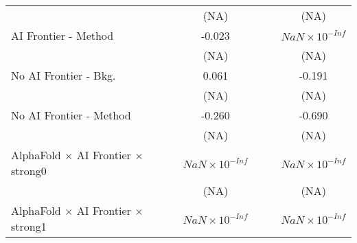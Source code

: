 \begin{tabular}{lcccccc}
                                                                              &                        &                        & (NA)                   &                        &                        & (NA)\\   
   AI Frontier - Method                                                       &                        &                        & -0.023                 &                        &                        & $NaN\times 10^{-Inf}$\\    
                                                                              &                        &                        & (NA)                   &                        &                        & (NA)\\   
   No AI Frontier - Bkg.                                                      &                        &                        & 0.061                  &                        &                        & -0.191\\   
                                                                              &                        &                        & (NA)                   &                        &                        & (NA)\\   
   No AI Frontier - Method                                                    &                        &                        & -0.260                 &                        &                        & -0.690\\   
                                                                              &                        &                        & (NA)                   &                        &                        & (NA)\\   
   AlphaFold $\times$ AI Frontier $\times$ strong0                            &                        &                        & $NaN\times 10^{-Inf}$  &                        &                        & $NaN\times 10^{-Inf}$\\    
                                                                              &                        &                        & (NA)                   &                        &                        & (NA)\\   
   AlphaFold $\times$ AI Frontier $\times$ strong1                            &                        &                        & $NaN\times 10^{-Inf}$  &                        &                        & $NaN\times 10^{-Inf}$\\    

\end{tabular}
